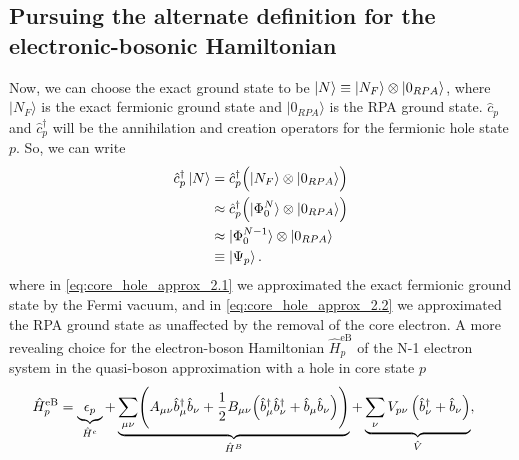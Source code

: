 \subsection{Pursuing the alternate definition for the electronic-bosonic Hamiltonian}
Now, we can choose the exact ground state to be $\ket{N}\equiv |N_F\rangle \otimes |0_{RPA}\rangle$, where $|N_F\rangle$ is the exact fermionic ground state and $|0_{RPA}\rangle$ is the RPA ground state. $\hat{c}_p$ and $\hat{c}_p^\dagger$ will be the annihilation and creation operators for the fermionic hole state $p$. So, we can write
\begin{align}
\hat{c}_p^\dagger \ket{N} &= \hat{c}_p^\dagger \Bigl( |N_F\rangle \otimes |0_{RPA}\rangle \Bigr) \\
&\approx \hat{c}_p^\dagger \Bigl( |\Phi_0^N\rangle \otimes |0_{RPA}\rangle \Bigr)
\label{eq:core_hole_approx_2.1}\\
& \approx |\Phi_0^{N-1}\rangle \otimes |0_{RPA}\rangle \label{eq:core_hole_approx_2.2}\\
&\equiv \ket{\Psi_p}.
\end{align}
where in \ref{eq:core_hole_approx_2.1} we approximated the exact fermionic ground state by the Fermi vacuum, and in \ref{eq:core_hole_approx_2.2} we approximated the RPA ground state as unaffected by the removal of the core electron.
A more revealing choice for the electron-boson Hamiltonian $\hat{H}_p^{\text{eB}}$ of the N-1 electron system in the quasi-boson approximation with a hole in core state $p$
\begin{align}
    \hat{H}_p^{\text{eB}} &= \underbrace{\epsilon_{p}}_{\hat{H}^e} + \underbrace{\sum_{\mu\nu} \Biggl( A_{\mu\nu} \hat{b}_\mu^\dagger \hat{b}_\nu + \frac{1}{2}B_{\mu\nu} \Bigl(\hat{b}_\mu^\dagger \hat{b}_\nu^\dagger + \hat{b}_\mu \hat{b}_\nu \Bigr) \Biggr)}_{\hat{H}^B} + \underbrace{\sum_{\nu} V_{p\nu} \left( \hat{b}_\nu^\dagger + \hat{b}_\nu \right)}_{\hat{V}} \label{eq:effective_hamiltonian},
\end{align}
